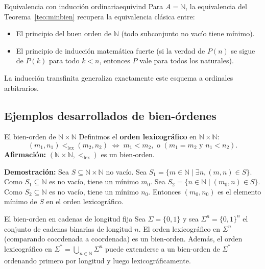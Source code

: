 \begin{observacion}{Equivalencia con inducción ordinaria}{equivind}
Para $A = \mathbb{N}$, la equivalencia del Teorema~\ref{teo:minbien} recupera la equivalencia clásica entre:
\begin{itemize}[leftmargin=2em]
  \item El principio del buen orden de $\mathbb{N}$ (todo subconjunto no vacío tiene mínimo).
  \item El principio de inducción matemática fuerte (si la verdad de $P(n)$ se sigue de $P(k)$ para todo $k < n$, entonces $P$ vale para todos los naturales).
\end{itemize}
La inducción transfinita generaliza exactamente este esquema a ordinales arbitrarios.
\end{observacion}

\subsection{Ejemplos desarrollados de bien-órdenes}

\begin{ejemplo}{El bien-orden de $\mathbb{N} \times \mathbb{N}$}{}
Definimos el \textbf{orden lexicográfico} en $\mathbb{N} \times \mathbb{N}$:
\[
  (m_1, n_1) <_{\mathrm{lex}} (m_2, n_2) \;\iff\; m_1 < m_2, \text{ o } (m_1 = m_2 \text{ y } n_1 < n_2).
\]
\textbf{Afirmación:} $(\mathbb{N} \times \mathbb{N}, <_{\mathrm{lex}})$ es un bien-orden.

\textbf{Demostración:} Sea $S \subseteq \mathbb{N} \times \mathbb{N}$ no vacío. Sea $S_1 = \{m \in \mathbb{N} \mid \exists n, (m,n) \in S\}$. Como $S_1 \subseteq \mathbb{N}$ es no vacío, tiene un mínimo $m_0$. Sea $S_2 = \{n \in \mathbb{N} \mid (m_0, n) \in S\}$. Como $S_2 \subseteq \mathbb{N}$ es no vacío, tiene un mínimo $n_0$. Entonces $(m_0, n_0)$ es el elemento mínimo de $S$ en el orden lexicográfico.
\end{ejemplo}

\begin{ejemplo}{El bien-orden en cadenas de longitud fija}{}
Sea $\Sigma = \{0, 1\}$ y sea $\Sigma^n = \{0,1\}^n$ el conjunto de cadenas binarias de longitud $n$. El orden lexicográfico en $\Sigma^n$ (comparando coordenada a coordenada) es un bien-orden. Además, el orden lexicográfico en $\Sigma^* = \bigcup_{n \in \mathbb{N}} \Sigma^n$ puede extenderse a un bien-orden de $\Sigma^*$ ordenando primero por longitud y luego lexicográficamente.
\end{ejemplo}

